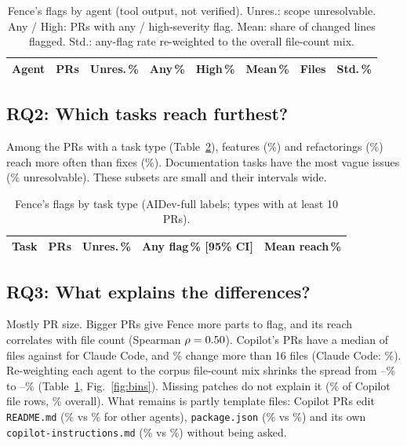\documentclass[10pt,conference]{IEEEtran}
\begin{document}
\begin{table}[t]\centering\caption{Fence's flags by agent (tool output, not verified). Unres.: scope unresolvable. Any / High: PRs with any / high-severity flag. Mean: share of changed lines flagged. Std.: any-flag rate re-weighted to the overall file-count mix.}\label{tab:agents}
\footnotesize\setlength{\tabcolsep}{2.6pt}\begin{tabular}{@{}lrrrrrrr@{}}\toprule
Agent & PRs & Unres.\,\% & Any\,\% & High\,\% & Mean\,\% & Files & Std.\,\%\\\midrule

\end{tabular}\end{table}

\subsection*{RQ2: Which tasks reach furthest?}
Among the \nTyped{} PRs with a task type (Table~\ref{tab:tasks}), features (\taskFeat\%) and refactorings (\taskRefactor\%) reach more often than fixes (\taskFix\%). Documentation tasks have the most vague issues (\unresDocsTask\% unresolvable). These subsets are small and their intervals wide.

\begin{table}[t]\centering\caption{Fence's flags by task type (AIDev-full labels; types with at least 10 PRs).}\label{tab:tasks}
\footnotesize\begin{tabular}{@{}lrrrr@{}}\toprule
Task & PRs & Unres.\,\% & Any flag\,\% [95\% CI] & Mean reach\,\%\\\midrule

\end{tabular}\end{table}

\subsection*{RQ3: What explains the differences?}
Mostly PR size. Bigger PRs give Fence more parts to flag, and its reach correlates with file count (Spearman $\rho=0.50$). Copilot's PRs have a median of \filesCopilot{} files against \filesClaude{} for Claude Code, and \bigCopilot\% change more than 16 files (Claude Code: \bigClaude\%). Re-weighting each agent to the corpus file-count mix shrinks the spread from \reachJules--\reachCopilot\% to \stdClaude--\stdCursor\% (Table~\ref{tab:agents}, Fig.~\ref{fig:bins}). Missing patches do not explain it (\missCopilot\% of Copilot file rows, \missAll\% overall). What remains is partly template files: Copilot PRs edit \texttt{README.md} (\readmeCopilot\% vs \readmeOther\% for other agents), \texttt{package.json} (\pkgCopilot\% vs \pkgOther\%) and its own \texttt{copilot-instructions.md} (\instrCopilot\% vs \instrOther\%) without being asked.
\end{document}
